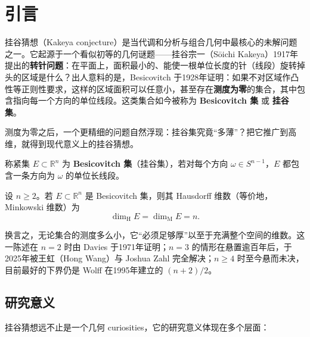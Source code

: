 \section{引言}\label{sec:introduction}

挂谷猜想（Kakeya conjecture）是当代调和分析与组合几何中最核心的未解问题之一。它起源于一个看似初等的几何谜题——挂谷宗一（S\=oichi Kakeya）1917年提出的\textbf{转针问题}：在平面上，面积最小的、能使一根单位长度的针（线段）旋转掉头的区域是什么？出人意料的是，Besicovitch 于1928年证明：如果不对区域作凸性等正则性要求，这样的区域面积可以任意小，甚至存在\textbf{测度为零}的集合，其中包含指向每一个方向的单位线段\cite{besicovitch1928}。这类集合如今被称为 \textbf{Besicovitch 集} 或 \textbf{挂谷集}。

测度为零之后，一个更精细的问题自然浮现：挂谷集究竟“多薄”？把它推广到高维，就得到现代意义上的挂谷猜想。

\begin{definition}[Besicovitch 集]\label{def:kakeya-set}
    称紧集 $E \subset \mathbb{R}^n$ 为 \textbf{Besicovitch 集}（挂谷集），若对每个方向 $\omega \in S^{n-1}$，$E$ 都包含一条方向为 $\omega$ 的单位长线段。
\end{definition}

\begin{conjecture}[挂谷猜想]\label{thm:kakeya}
    设 $n \ge 2$。若 $E \subset \mathbb{R}^n$ 是 Besicovitch 集，则其 Hausdorff 维数（等价地，Minkowski 维数）为
    \begin{equation}
        \dim_{\mathrm{H}} E = \dim_{\mathrm{M}} E = n .
    \end{equation}
\end{conjecture}

换言之，无论集合的测度多么小，它“必须足够厚”以至于充满整个空间的维数。这一陈述在 $n = 2$ 时由 Davies 于1971年证明\cite{davies1971}；$n = 3$ 的情形在悬置逾百年后，于2025年被王虹（Hong Wang）与 Joshua Zahl 完全解决\cite{wangzahl2025}；$n \ge 4$ 时至今悬而未决，目前最好的下界仍是 Wolff 在1995年建立的 $(n+2)/2$\cite{wolff1995}。

\subsection{研究意义}

挂谷猜想远不止是一个几何 curiosities，它的研究意义体现在多个层面：

